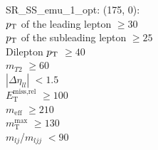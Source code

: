 SR\_SS\_emu\_1\_opt: (175, 0): \\
$p_{\text{T}}$ of the leading lepton $\geq 30$ \\
$p_{\text{T}}$ of the subleading lepton $\geq 25$ \\
Dilepton $p_{\text{T}}$ $\geq 40$ \\
$m_{T2}$ $\geq 60$ \\
$|\Delta\eta_{ll}|$ $<1.5$ \\
$E_{\text{T}}^{\text{miss,rel}}$ $\geq 100$ \\
$m_{\text{eff}}$ $\geq 210$ \\
$m_{\text{T}}^{\text{max}}$ $\geq 130$ \\
$m_{lj}$/$m_{ljj}$ $<90$ \\
